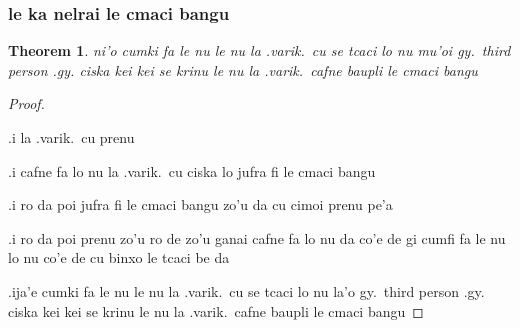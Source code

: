 \documentclass{article}
\newtheorem{thm}{Theorem}
\begin{document}
\subsubsection{le ka nelrai le cmaci bangu}
\begin{thm}
	ni'o cumki fa le nu le nu la .varik.\ cu se tcaci lo nu mu'oi gy.\ third person .gy. ciska kei kei se krinu le nu la .varik.\ cafne baupli le cmaci bangu
\end{thm}
\begin{proof}
	${ }$

	.i la .varik.\ cu prenu

	.i cafne fa lo nu la .varik.\ cu ciska lo jufra fi le cmaci bangu

	.i ro da poi jufra fi le cmaci bangu zo'u da cu cimoi prenu pe'a

	.i ro da poi prenu zo'u ro de zo'u ganai cafne fa lo nu da co'e de gi cumfi fa le nu lo nu co'e de cu binxo le tcaci be da

	.ija'e cumki fa le nu le nu la .varik.\ cu se tcaci lo nu la'o gy.\ third person .gy. ciska kei kei se krinu le nu la .varik.\ cafne baupli le cmaci bangu
\end{proof}
\end{document}
